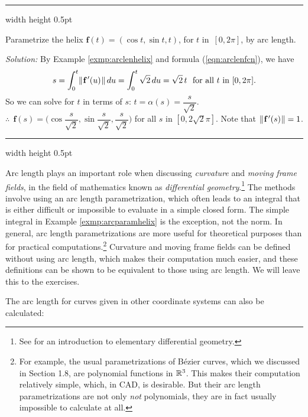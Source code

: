 \vspace{2mm}
\hrule width \textwidth height 0.5pt
\begin{exmp}\label{exmp:arcparamhelix}
 Parametrize the helix $\textbf{f}(t) = (\cos t , \sin t , t)$, for $t$ in~$[0,2\pi]$, by arc length.\vspace{1mm}
 \par\noindent \emph{Solution:} By Example \ref{exmp:arclenhelix} and formula (\ref{eqn:arclenfcn}), we have
 \begin{displaymath}
  s = \int_{0}^{t} \lVert\mspace{1mu}\textbf{f}\,'(u)\mspace{1mu}\rVert\,du = \int_{0}^{t} \sqrt{2} \,du = \sqrt{2}\,t
  \text{~~for all $t$ in $[0,2\pi]$.}
 \end{displaymath}
 So we can solve for $t$ in terms of $s$: $t = \alpha(s) = \dfrac{s}{\sqrt{2}}$.\\$\therefore ~~ \textbf{f}(s) =
 \biggl( \cos \dfrac{s}{\sqrt{2}} , \sin \dfrac{s}{\sqrt{2}} , \dfrac{s}{\sqrt{2}} \biggr)$ for all $s$
 in $[0,2\sqrt{2} \pi]$. Note that $\lVert\mspace{1mu}\textbf{f}\,'(s)\mspace{1mu}\rVert = 1$.
\end{exmp}
\hrule width \textwidth height 0.5pt
\vspace{2mm}

Arc length plays an important role when discussing \emph{curvature} and \emph{moving frame
fields}, in the field of mathematics known as \emph{differential
geometry}.\footnote{See \cite{one} for an introduction to elementary differential geometry.} The methods involve using
an arc length parametrization, which often leads to an integral that is either difficult or impossible
to evaluate in a simple closed form. The simple integral in Example \ref{exmp:arcparamhelix} is the exception, not the
norm. In general, arc length parametrizations are more useful for theoretical purposes than for practical
computations.\footnote{For example, the usual parametrizations of B\'{e}zier curves, which we discussed in Section 1.8,
are polynomial functions in $\mathbb{R}^{3}$. This makes their computation relatively simple, which, in CAD, is desirable.
But their arc length parametrizations are not only \emph{not} polynomials, they are in fact usually impossible to
calculate at all.}
Curvature and moving frame fields can be defined without using arc length, which makes their computation
much easier, and these definitions can be shown to be equivalent to those using arc length. We will leave this to
the exercises.

The arc length for curves given in other coordinate systems can also be calculated:

